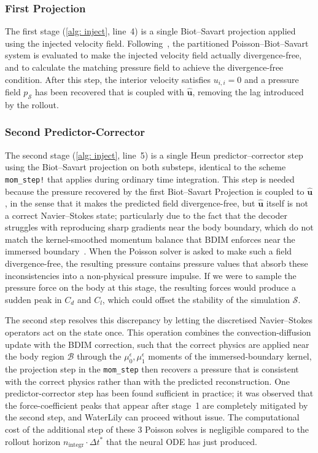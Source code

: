 \subsubsection{First Projection}

The first stage (\autoref{alg: inject}, line~4) is a single Biot--Savart projection applied using the injected velocity field. Following~\cite{BiotWeymouth2025}, the partitioned Poisson--Biot--Savart system is evaluated to make the injected velocity field actually divergence-free, and to calculate the matching pressure field to achieve the divergence-free condition. After this step, the interior velocity satisfies $u_{i,i} = 0$ and a pressure field $p_{\mathcal{S}}$ has been recovered that is coupled with $\hat{\mathbf{u}}$, removing the lag introduced by the rollout.

\subsubsection{Second Predictor-Corrector}
The second stage (\autoref{alg: inject}, line~5) is a single Heun predictor--corrector step using the Biot--Savart projection on both substeps, identical to the scheme \texttt{mom\_step!} that applies during ordinary time integration. This step is needed because the pressure recovered by the first Biot--Savart Projection is coupled to  $\hat{\mathbf{u}}$, in the sense that it makes the predicted field divergence-free, but $\hat{\mathbf{u}}$ itself is not a correct Navier--Stokes state; particularly due to the fact that the decoder struggles with reproducing sharp gradients near the body boundary, which do not match the kernel-smoothed momentum balance that BDIM enforces near the immersed boundary~\cite{Maertens2015}. When the Poisson solver is asked to make such a field divergence-free, the resulting pressure contains pressure values that absorb these inconsistencies into a non-physical pressure impulse. If we were to sample the pressure force on the body at this stage, the resulting forces would produce a sudden peak in $C_d$ and $C_l$, which could offset the stability of the simulation $\mathcal{S}$. 


The second step resolves this discrepancy by letting the discretised Navier--Stokes operators act on the state once. This operation combines the convection-diffusion update with the BDIM correction, such that the correct physics are applied near the body region $\mathcal{B}$ through the $\mu^\epsilon_0,\mu^\epsilon_1$ moments of the immersed-boundary kernel, the projection step in the \texttt{mom\_step} then recovers a pressure that is consistent with the correct physics rather than with the predicted reconstruction. One predictor-corrector step has been found sufficient in practice; it was observed that the force-coefficient peaks that appear after stage~1 are completely mitigated by the second step, and WaterLily can proceed without issue. The computational cost of the additional step of these 3 Poisson solves is negligible compared to the rollout horizon  $n_\text{integr}\!\cdot\!\Delta t^*$ that the neural ODE has just produced.


